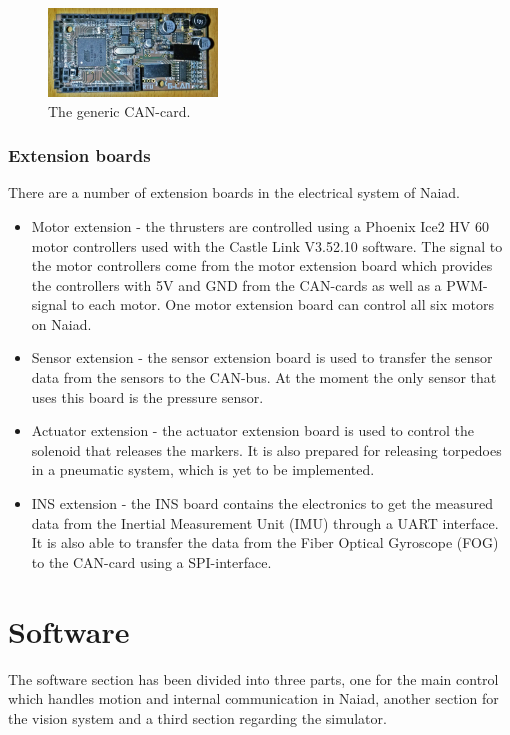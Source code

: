\documentclass[twoside,12pt]{article}
\begin{document}
\begin{multicols*}{2}
\begin{figure}[H]
\begin{center}
\includegraphics[width=0.4\textwidth]{./images/CAN.jpg}
\caption{The generic CAN-card.}
\label{CANcard}
\end{center}
\end{figure}

\subsubsection{Extension boards}
There are a number of extension boards in the electrical system of Naiad. 
\begin{itemize}
\item Motor extension - the thrusters are controlled using a Phoenix Ice2 HV 60 motor controllers used with the Castle Link V3.52.10 software. The signal to the motor controllers come from the motor extension board which provides the controllers with 5V and GND from the CAN-cards as well as a PWM-signal to each motor. One motor extension board can control all six motors on Naiad.
\item Sensor extension - the sensor extension board is used to transfer the sensor data from the sensors to the CAN-bus. At the moment the only sensor that uses this board is the pressure sensor.
\item Actuator extension - the actuator extension board is used to control the solenoid that releases the markers. It is also prepared for releasing torpedoes in a pneumatic system, which is yet to be implemented. 
\item INS extension - the INS board contains the electronics to get the measured data from the Inertial Measurement Unit (IMU) through a UART interface. It is also able to transfer the data from the Fiber Optical Gyroscope (FOG) to the CAN-card using a SPI-interface. 
\end{itemize}

\section{Software}
\label{Software}
The software section has been divided into three parts, one for the main control which handles motion and internal communication in Naiad, another section for the vision system and a third section regarding the simulator. 

\end{multicols*}
\end{document}
